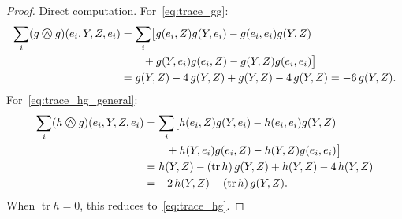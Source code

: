 \documentclass[10pt,a4paper]{amsart}
\newcommand{\owedge}{\mathbin{%
  \text{%
    \ooalign{%
      \hfil$\wedge$\hfil\cr
      \hfil\raisebox{0.05em}{$\bigcirc$}\hfil\cr
    }%
  }%
}}
\begin{document}
\begin{proof}
Direct computation. For~\eqref{eq:trace_gg}:
\begin{align*}
  \sum_i (g\owedge g)(e_i,Y,Z,e_i)
  &= \sum_i \bigl[g(e_i,Z)g(Y,e_i) - g(e_i,e_i)g(Y,Z)\\
  &\qquad + g(Y,e_i)g(e_i,Z) - g(Y,Z)g(e_i,e_i)\bigr]\\
  &= g(Y,Z) - 4\,g(Y,Z) + g(Y,Z) - 4\,g(Y,Z) = -6\,g(Y,Z).
\end{align*}
For~\eqref{eq:trace_hg_general}:
\begin{align*}
  \sum_i (h\owedge g)(e_i,Y,Z,e_i)
  &= \sum_i \bigl[h(e_i,Z)g(Y,e_i) - h(e_i,e_i)g(Y,Z)\\
  &\qquad + h(Y,e_i)g(e_i,Z) - h(Y,Z)g(e_i,e_i)\bigr]\\
  &= h(Y,Z) - (\operatorname{tr}h)\,g(Y,Z) + h(Y,Z) - 4\,h(Y,Z) \\
  &= -2\,h(Y,Z) - (\operatorname{tr}h)\,g(Y,Z).
\end{align*}
When $\operatorname{tr}h = 0$, this reduces to~\eqref{eq:trace_hg}.
\end{proof}
\end{document}
